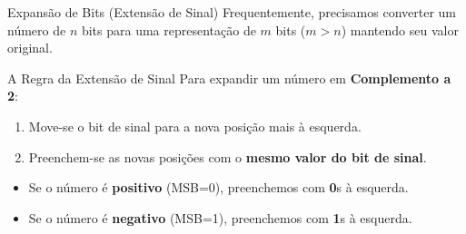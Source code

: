 \begin{frame}{Expansão de Bits (Extensão de Sinal)}
    Frequentemente, precisamos converter um número de $n$ bits para uma representação de $m$ bits ($m > n$) mantendo seu valor original.

    \begin{block}{A Regra da Extensão de Sinal}
        Para expandir um número em \textbf{Complemento a 2}:
        \begin{enumerate}
            \item Move-se o bit de sinal para a nova posição mais à esquerda.
            \item Preenchem-se as novas posições com o \textbf{mesmo valor do bit de sinal}.
        \end{enumerate}
    \end{block}

    \begin{itemize}
        \item Se o número é \textbf{positivo} (MSB=0), preenchemos com \textbf{0}s à esquerda.
        \item Se o número é \textbf{negativo} (MSB=1), preenchemos com \textbf{1}s à esquerda.
    \end{itemize}
\end{frame}

